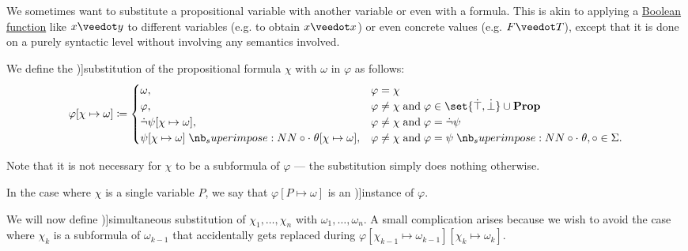 \begin{definition}\label{def:propositional_substitution}
  We sometimes want to substitute a propositional variable with another variable or even with a formula. This is akin to applying a \hyperref[def:boolean_function]{Boolean function} like \( x \synvee y \) to different variables (e.g. to obtain \( x \synvee x \)) or even concrete values (e.g. \( F \synvee T \)), except that it is done on a purely syntactic level without involving any semantics involved.

  \begin{thmenum}
     We define the \term[ru=подстановка (\cite[66]{КолмогоровДрагалин2006})]{substitution} of the propositional formula \( \chi \) with \( \omega \) in \( \varphi \) as follows:
    \begin{equation}\label{eq:def:propositional_substitution/single}
      \varphi[\chi \mapsto \omega] \coloneqq \begin{cases}
        \omega,                                                         &\varphi = \chi \\
        \varphi,                                                        &\varphi \neq \chi \T{and} \varphi \in \set{ \syntop, \synbot } \cup \boldop{Prop} \\
        \synneg \psi[\chi \mapsto \omega],                              &\varphi \neq \chi \T{and} \varphi = \synneg \psi \\
        \psi[\chi \mapsto \omega] \syncirc \theta[\chi \mapsto \omega], &\varphi \neq \chi \T{and} \varphi = \psi \syncirc \theta, \circ \in \Sigma.
      \end{cases}
    \end{equation}

    Note that it is not necessary for \( \chi \) to be a subformula of \( \varphi \) --- the substitution simply does nothing otherwise.

    In the case where \( \chi \) is a single variable \( P \), we say that \( \varphi[P \mapsto \omega] \) is an \term[en=substitution instance (\cite[67]{VanDalen2004})]{instance} of \( \varphi \).

    \mimprovised We will now define \term[en=simultaneous substitution (\cite[exer. 2.2.50]{Hinman2005})]{simultaneous substitution} of \( \chi_1, \ldots, \chi_n \) with \( \omega_1, \ldots, \omega_n \). A small complication arises because we wish to avoid the case where \( \chi_k \) is a subformula of \( \omega_{k-1} \) that accidentally gets replaced during \( \varphi[\chi_{k-1} \mapsto \omega_{k-1}][\chi_k \mapsto \omega_k] \).


\end{thmenum}
\end{definition}
